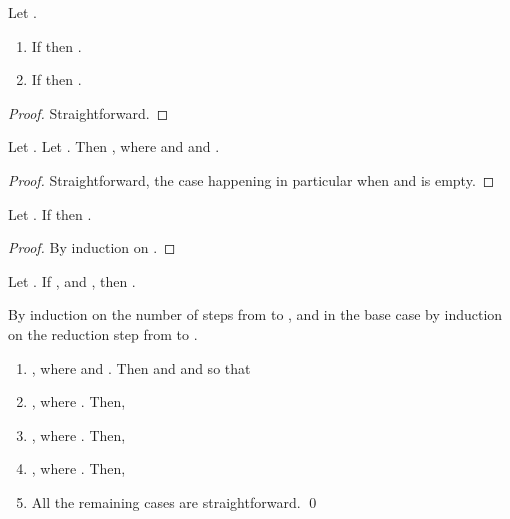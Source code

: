 \documentclass{LMCS}
\renewcommand{\>}{\rightarrow}
\begin{document}
\begin{lem}
\label{l:newu-pass-to-sub} 
Let . 
\begin{enumerate}[]
\item If  then .
\item   If  then .
\end{enumerate}
\end{lem}


\begin{proof}
Straightforward.
\end{proof}







\begin{lem}
\label{l:gen-new} 
Let .
Let .
Then , where  
      and  and .      
\end{lem}

\begin{proof}
Straightforward, the case  happening in particular
when  and  is empty.
\end{proof}


\begin{lem}
\label{l:out-subs}
Let . If  then
. 
\end{lem}

\begin{proof}
By induction on . 
\end{proof}



\begin{lem}
\label{l:substituion-new-u-o}
Let . 
If ,
 and ,
then . 
\end{lem}


\proof
By induction on the number of steps from  to , and in the
base case by induction on the reduction step from  to . 
\begin{enumerate}[]
\item ,  
      where 
      and . 
     Then  and  and   so that 
     
\item , where .
        Then,
           
  \item , where .
        Then,
         
  \item , where .
 Then, 
          
\item All the remaining cases are straightforward.       
\qed 
\end{enumerate}
\end{document}
